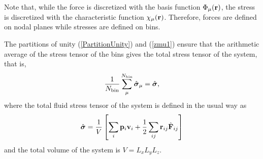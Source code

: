 \documentclass[b5paper,openright,10pt]{book}
\begin{document}
Note  that, while  the force  is discretized  with the  basis function
$\Phi_\mu({\bf r})$, the stress is discretized with the characteristic
function $\chi_\mu({\bf  r})$. Therefore, forces are  defined on nodal
planes    while    stresses    are    defined    on    bins.     


The partitions  of unity (\ref{PartitionUnity}) and  (\ref{zmu1}) ensure
that the arithmetic average of the stress tensor of the bins gives the
total stress tensor of the system, that is,
\begin{align}
\frac{1}{N_{\rm bin}}\sum_{\mu}^{N_{\rm bin}}\hat{\boldsymbol{\sigma}}_{\mu}=\hat{\boldsymbol{\sigma}},
\end{align}
where the total fluid stress tensor of the system is defined in the usual way as
\begin{align}
  \hat{\boldsymbol{\sigma}}=\frac{1}{V}\left[\sum_{i}{\bf p}_i{\bf v}_i
+\frac{1}{2}\sum_{ij}{\bf r}_{ij}\hat{\bf F}_{ij}\right]
\end{align}
and the total volume of the system is $V=L_xL_yL_z$.
\end{document}
